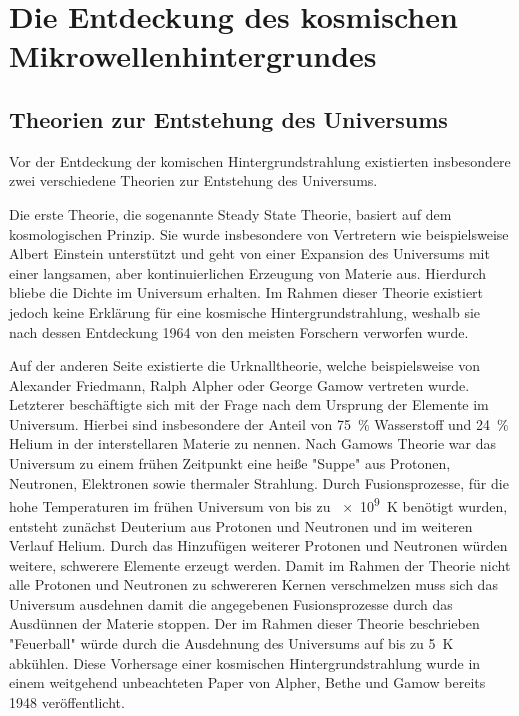 
\section{Die Entdeckung des kosmischen Mikrowellenhintergrundes}


\subsection{Theorien zur Entstehung des Universums}

Vor der Entdeckung der komischen Hintergrundstrahlung existierten insbesondere zwei verschiedene Theorien zur Entstehung des Universums.

Die erste Theorie, die sogenannte Steady State Theorie, basiert auf dem kosmologischen Prinzip.
Sie wurde insbesondere von Vertretern wie beispielsweise Albert Einstein unterstützt und geht von einer Expansion des Universums mit einer langsamen, aber kontinuierlichen Erzeugung von Materie aus. 
Hierdurch bliebe die Dichte im Universum erhalten.
Im Rahmen dieser Theorie existiert jedoch keine Erklärung für eine kosmische Hintergrundstrahlung, weshalb sie nach dessen Entdeckung 1964 von den meisten Forschern verworfen wurde.

Auf der anderen Seite existierte die Urknalltheorie, welche beispielsweise von Alexander Friedmann, Ralph Alpher oder George Gamow vertreten wurde.
Letzterer beschäftigte sich mit der Frage nach dem Ursprung der Elemente im Universum.
Hierbei sind insbesondere der Anteil von \SI{75}{\percent} Wasserstoff und \SI{24}{\percent} Helium in der interstellaren Materie zu nennen.
Nach Gamows Theorie war das Universum zu einem frühen Zeitpunkt eine heiße "Suppe" aus Protonen, Neutronen, Elektronen sowie thermaler Strahlung.
Durch Fusionsprozesse, für die hohe Temperaturen im frühen Universum von bis zu \SI{e9}{\kelvin} benötigt wurden, entsteht zunächst Deuterium aus Protonen und Neutronen und im weiteren Verlauf Helium.
Durch das Hinzufügen weiterer Protonen und Neutronen würden weitere, schwerere Elemente erzeugt werden.
Damit im Rahmen der Theorie nicht alle Protonen und Neutronen zu schwereren Kernen verschmelzen muss sich das Universum ausdehnen damit die angegebenen Fusionsprozesse durch das Ausdünnen der Materie stoppen.
Der im Rahmen dieser Theorie beschrieben "Feuerball" würde durch die Ausdehnung des Universums auf bis zu \SI{5}{\kelvin} abkühlen.
Diese Vorhersage einer kosmischen Hintergrundstrahlung wurde in einem weitgehend unbeachteten Paper von Alpher, Bethe und Gamow bereits 1948 veröffentlicht. 

